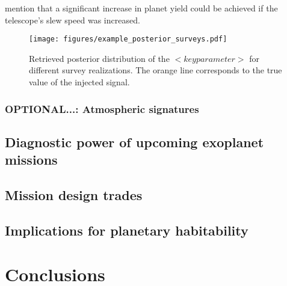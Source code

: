 \documentclass[modern]{aastex631}
\begin{document}
\begin{note}
    \citet{Penny2019} mention that a significant increase in planet yield could be achieved if the telescope's slew speed was increased.
\end{note}

\begin{figure}[ht!]
    \begin{centering}

        \texttt{[image: figures/example\_posterior\_surveys.pdf]}
        \caption{
            Retrieved posterior distribution of the $<key parameter>$ for different survey realizations.
            The orange line corresponds to the true value of the injected signal.
        }
        \label{fig:posterior_surveys}
    \end{centering}
\end{figure}

\subsubsection{OPTIONAL...: Atmospheric signatures}


\subsection{Diagnostic power of upcoming exoplanet missions}

\subsection{Mission design trades}\label{sec:mission-design-trades}

\subsection{Implications for planetary habitability}\label{sec:habitability}



\section{Conclusions}
\end{document}
